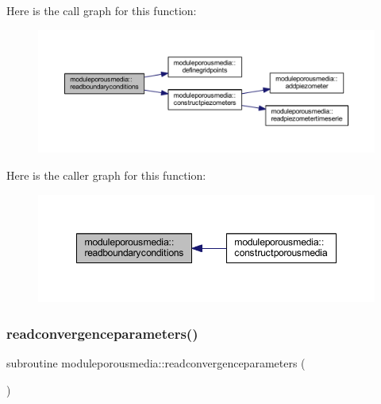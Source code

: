Here is the call graph for this function\+:\nopagebreak
\begin{figure}[H]
\begin{center}
\leavevmode
\includegraphics[width=350pt]{namespacemoduleporousmedia_afc9e4c782508e0d8b55b1c444d54d741_cgraph}
\end{center}
\end{figure}
Here is the caller graph for this function\+:\nopagebreak
\begin{figure}[H]
\begin{center}
\leavevmode
\includegraphics[width=348pt]{namespacemoduleporousmedia_afc9e4c782508e0d8b55b1c444d54d741_icgraph}
\end{center}
\end{figure}
\mbox{\label{namespacemoduleporousmedia_a8cce03cb321fdeb4b547654baa7cdf81}} 
\subsubsection{\texorpdfstring{readconvergenceparameters()}{readconvergenceparameters()}}
{\footnotesize\ttfamily subroutine moduleporousmedia\+::readconvergenceparameters (\begin{DoxyParamCaption}{ }\end{DoxyParamCaption})\hspace{0.3cm}{\ttfamily [private]}}

